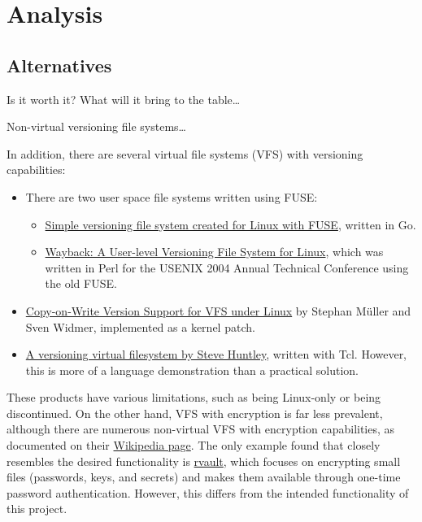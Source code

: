 \chapter{Analysis}
\label{chap:analysis}

\section{Alternatives}\label{sec:alternatives}


Is it worth it?
What will it bring to the table\ldots

Non-virtual versioning file systems\ldots %

In addition, there are several virtual file systems (VFS) with versioning capabilities:

\begin{itemize}
\item There are two user space file systems written using FUSE:
\begin{itemize}
\item \href{https://github.com/FooSoft/vfs}{Simple versioning file system created for Linux with FUSE}, written in Go.
\item \href{https://www.usenix.org/legacy/events/usenix04/tech/freenix/cornell.html}{Wayback: A User-level Versioning File System for Linux}, which was written in Perl for the USENIX 2004 Annual Technical Conference using the old FUSE\@.
\end{itemize}
\item \href{https://osm.hpi.de/vvfs/}{Copy-on-Write Version Support for VFS under Linux} by Stephan Müller and Sven Widmer, implemented as a kernel patch.
\item \href{https://wiki.tcl-lang.org/page/A+versioning+virtual+filesystem}{A versioning virtual filesystem by Steve Huntley}, written with Tcl.
However, this is more of a language demonstration than a practical solution.
\end{itemize}

These products have various limitations, such as being Linux-only or being discontinued.
On the other hand, VFS with encryption is far less prevalent, although there are numerous non-virtual VFS with encryption capabilities, as documented on their \href{https://en.wikipedia.org/wiki/Encrypting_File_System}{Wikipedia page}.
The only example found that closely resembles the desired functionality is \href{https://github.com/rmind/rvault}{rvault}, which focuses on encrypting small files (passwords, keys, and secrets) and makes them available through one-time password authentication.
However, this differs from the intended functionality of this project.

